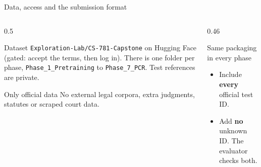 \documentclass[aspectratio=169,11pt]{beamer}
\newcommand{\code}[1]{\texttt{\small #1}}
\begin{document}
\begin{frame}{Data, access and the submission format}
  \begin{columns}[T]
    \begin{column}{0.5\textwidth}
      \begin{block}{Dataset}
        \small
        \code{Exploration-Lab/CS-781-Capstone} on Hugging Face (gated: accept the terms, then log in).
        There is one folder per phase, \code{Phase\_1\_Pretraining} to \code{Phase\_7\_PCR}.
        Test references are private.
      \end{block}
      \begin{alertblock}{Only official data}
        \small
        No external legal corpora, extra judgments, statutes or scraped court data.
      \end{alertblock}
    \end{column}
    \begin{column}{0.46\textwidth}
      \begin{block}{Same packaging in every phase}
        \small
        \begin{itemize}
          \item Include \textbf{every} official test ID.
          \item Add \textbf{no} unknown ID. The evaluator checks both.
        \end{itemize}
      \end{block}
    \end{column}
  \end{columns}
\end{frame}
\end{document}

